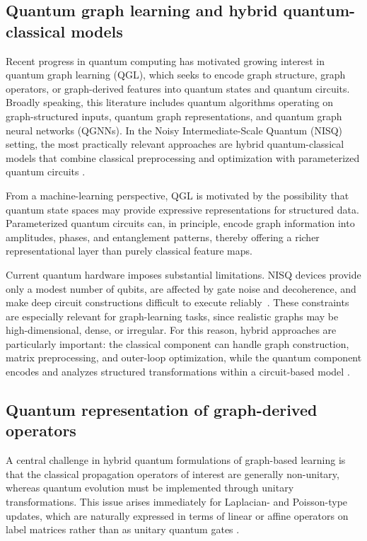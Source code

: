 \documentclass[11pt,a4paper]{article}
\begin{document}
\subsection{Quantum graph learning and hybrid quantum-classical models}\label{subsec:qgl}

Recent progress in quantum computing has motivated growing interest in quantum graph learning (QGL), which seeks to encode graph structure, graph operators, or graph-derived features into quantum states and quantum circuits. Broadly speaking, this literature includes quantum algorithms operating on graph-structured inputs, quantum graph representations, and quantum graph neural networks (QGNNs). In the Noisy Intermediate-Scale Quantum (NISQ) setting, the most practically relevant approaches are hybrid quantum-classical models that combine classical preprocessing and optimization with parameterized quantum circuits \cite{ceschini2024qgnnreview}.

From a machine-learning perspective, QGL is motivated by the possibility that quantum state spaces may provide expressive representations for structured data. Parameterized quantum circuits can, in principle, encode graph information into amplitudes, phases, and entanglement patterns, thereby offering a richer representational layer than purely classical feature maps.

Current quantum hardware imposes substantial limitations. NISQ devices provide only a modest number of qubits, are affected by gate noise and decoherence, and make deep circuit constructions difficult to execute reliably~\cite{preskill2018quantum}. These constraints are especially relevant for graph-learning tasks, since realistic graphs may be high-dimensional, dense, or irregular. For this reason, hybrid approaches are particularly important: the classical component can handle graph construction, matrix preprocessing, and outer-loop optimization, while the quantum component encodes and analyzes structured transformations within a circuit-based model \cite{bharti2022nisq}.

\subsection{Quantum representation of graph-derived operators}\label{subsec:qrep}

A central challenge in hybrid quantum formulations of graph-based learning is that the classical propagation operators of interest are generally non-unitary, whereas quantum evolution must be implemented through unitary transformations. This issue arises immediately for Laplacian- and Poisson-type updates, which are naturally expressed in terms of linear or affine operators on label matrices rather than as unitary quantum gates \cite{gilyen2019quantum}.
\end{document}
